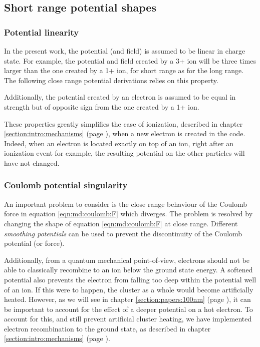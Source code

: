 \subsection{Short range potential shapes}
\label{section:intro:md:potentials}

\subsubsection{Potential linearity}
\label{section:intro:md:potentials:linear}

In the present work, the potential (and field) is assumed to be linear in
charge state. For example, the potential and field created by a 3+ ion will be
three times larger than the one created by a 1+ ion, for short range as for the
long range. The following close range potential derivations relies on this
property.

Additionally, the potential created by an electron is assumed to be equal in
strength but of opposite sign from the one created by a 1+ ion.

These properties greatly simplifies the case of ionization, described in chapter
\ref{section:intro:mechanisms} (page \pageref{section:intro:mechanisms}),
when a new electron is created in the code.
Indeed, when an electron is located exactly on top of an ion, right after
an ionization event for example, the resulting potential on the other particles
will have not changed.


\subsubsection{Coulomb potential singularity}
\label{section:intro:md:potentials:singularity}

An important problem to consider is the close range behaviour of the Coulomb force
in equation \eqref{eqn:md:coulomb:F} which diverges. The problem is resolved by
changing the shape of equation \eqref{eqn:md:coulomb:F} at close range.
Different \textit{smoothing potentials} can be used to prevent the
discontinuity of the Coulomb potential (or force).

Additionally, from a quantum mechanical point-of-view, electrons should not be
able to classically recombine to an ion below the ground state energy.
A softened potential also prevents the electron from falling too deep within the
potential well of an ion. If this were to happen, the cluster as a whole would
become artificially heated. However, as we will see in chapter
\ref{section:papers:100nm} (page \pageref{section:papers:100nm}), it can be
important to account for the effect of a deeper potential on a hot electron. To
account for this, and still prevent artificial cluster heating, we have
implemented electron recombination to the ground state, as described in chapter
\ref{section:intro:mechanisms} (page \pageref{section:intro:mechanisms}).

